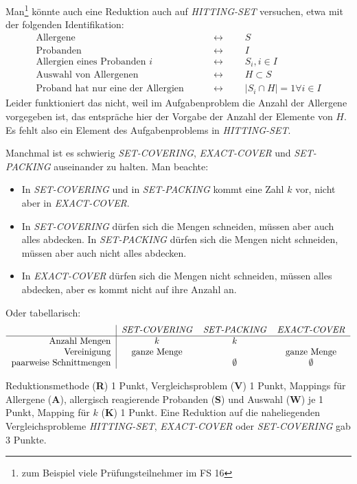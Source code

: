\begin{diskussion}
Man\footnote{zum Beispiel viele Prüfungsteilnehmer im FS 16}
könnte auch eine Reduktion auch auf {\em HITTING-SET} versuchen, etwa
mit der folgenden Identifikation:
\begin{align*}
\text{Allergene}                    &\qquad\leftrightarrow\qquad S             \\
\text{Probanden}                    &\qquad\leftrightarrow\qquad I             \\
\text{Allergien eines Probanden $i$}&\qquad\leftrightarrow\qquad S_i, i\in I   \\
\text{Auswahl von Allergenen}       &\qquad\leftrightarrow\qquad H\subset S    \\
\text{Proband hat nur eine der Allergien}&\qquad\leftrightarrow\qquad |S_i\cap H|=1\forall i\in I
\end{align*}
Leider funktioniert das nicht, weil im Aufgabenproblem die Anzahl der Allergene
vorgegeben ist, das entspräche hier der Vorgabe der Anzahl der Elemente
von $H$.
Es fehlt also ein Element des Aufgabenproblems in {\em HITTING-SET}.

Manchmal ist es schwierig {\em SET-COVERING}, {\em EXACT-COVER} und
{\em SET-PACKING} auseinander zu halten.
Man beachte:
\begin{itemize}
\item
In {\em SET-COVERING} und in {\em SET-PACKING} kommt eine Zahl $k$ vor,
nicht aber in {\em EXACT-COVER}.
\item
In {\em SET-COVERING} dürfen sich die Mengen schneiden, müssen aber auch
alles abdecken. 
In {\em SET-PACKING} dürfen sich die Mengen nicht schneiden, müssen aber
auch nicht alles abdecken.
\item
In {\em EXACT-COVER} dürfen sich die Mengen nicht schneiden, müssen alles
abdecken, aber es kommt nicht auf ihre Anzahl an.
\end{itemize}
Oder tabellarisch:
\[
\begin{tabular}{r|ccc}
                       &{\em SET-COVERING}&{\em SET-PACKING}&{\em EXACT-COVER}\\
\hline
Anzahl Mengen          &$k$               &$k$              &           \\
Vereinigung            &ganze Menge       &                 &ganze Menge\\
paarweise Schnittmengen&                  &$\emptyset$      &$\emptyset$
\end{tabular}
\]
\end{diskussion}

\begin{bewertung}
Reduktionsmethode ({\bf R}) 1 Punkt,
Vergleichsproblem ({\bf V}) 1 Punkt,
Mappings für Allergene ({\bf A}), allergisch reagierende Probanden ({\bf S})
und Auswahl ({\bf W}) je 1 Punkt,
Mapping für $k$ ({\bf K}) 1 Punkt.
Eine Reduktion auf die naheliegenden Vergleichsprobleme {\em HITTING-SET},
{\em EXACT-COVER} oder {\em SET-COVERING} gab 3 Punkte.
\end{bewertung}


